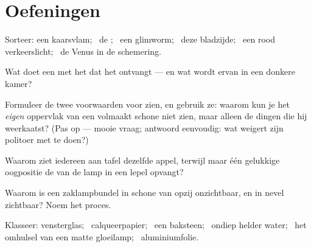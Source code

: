 \section{Oefeningen}

\begin{exercise}[$\star$]\label{exo:g7:light-sources-propagation:1}
Sorteer: een kaarsvlam; \ de ; \ een glimworm; \ deze bladzijde;
\ een rood verkeerslicht; \ de  Venus in de schemering.
\end{exercise}

\begin{exercise}[$\star$]\label{exo:g7:light-sources-propagation:2}
Wat doet een  met het  dat het ontvangt
--- en wat wordt ervan in een donkere kamer?
\end{exercise}

\begin{exercise}[$\star$]\label{exo:g7:light-sources-propagation:3}
Formuleer de twee voorwaarden voor zien, en gebruik ze: waarom kun je
het \emph{eigen} oppervlak van een volmaakt schone  niet zien,
maar alleen de dingen die hij weerkaatst? (Pas op --- mooie vraag;
antwoord eenvoudig: wat weigert zijn politoer met  te doen?)
\end{exercise}

\begin{exercise}[$\star$]\label{exo:g7:light-sources-propagation:4}
Waarom ziet iedereen aan tafel dezelfde appel, terwijl maar één
gelukkige oogpositie de  van de lamp in een lepel opvangt?
\end{exercise}

\begin{exercise}[$\star$]\label{exo:g7:light-sources-propagation:5}
Waarom is een zaklampbundel in schone  van opzij onzichtbaar,
en in nevel zichtbaar? Noem het proces.
\end{exercise}

\begin{exercise}[$\star$]\label{exo:g7:light-sources-propagation:6}
Klasseer: vensterglas; \ calqueerpapier; \ een baksteen; \ ondiep
helder water; \ het omhulsel van een matte gloeilamp; \
aluminiumfolie.
\end{exercise}

